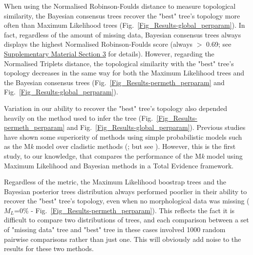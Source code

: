 \documentclass[12pt,letterpaper]{article}
\begin{document}
When using the Normalised Robinson-Foulds distance to measure topological similarity, the Bayesian consensus trees recover the "best" tree's topology more often than Maximum Likelihood trees (Fig.~\ref{Fig_Results-global_perparam}). In fact, regardless of the amount of missing data, Bayesian consensus trees always displays the highest Normalised Robinson-Foulds score (always $>$ 0.69; see \hyperref[SupplementaryMaterial]{Supplementary Material Section 3} for details). However, regarding the Normalised Triplets distance, the topological similarity with the "best" tree's topology decreases in the same way for both the Maximum Likelihood trees and the Bayesian consensus trees (Fig.~\ref{Fig_Results-permeth_perparam} and Fig.~\ref{Fig_Results-global_perparam}).

Variation in our ability to recover the "best" tree's topology also depended heavily on the method used to infer the tree (Fig.~\ref{Fig_Results-permeth_perparam} and Fig.~\ref{Fig_Results-global_perparam}). Previous studies have shown some superiority of methods using simple probabilistic models such as the M\textit{k} model \citep{lewisa2001} over cladistic methods (\citealt{wrightbayesian2014}; but see \citealt{spencerefficacy2013}). However, this is the first study, to our knowledge, that compares the performance of the M\textit{k} model \citep{lewisa2001} using Maximum Likelihood and Bayesian methods in a Total Evidence framework. %

Regardless of the metric, the Maximum Likelihood boostrap trees and the Bayesian posterior trees distribution always performed poorlier in their ability to recover the "best" tree's topology, even when no morphological data was missing ($M_{L}$=0\% - Fig.~\ref{Fig_Results-permeth_perparam}). This reflects the fact it is difficult to compare two distributions of trees, and each comparison between a set of "missing data" tree and "best" tree in these cases involved 1000 random pairwise comparisons rather than just one. This will obviously add noise to the results for these two methods.
\end{document}
